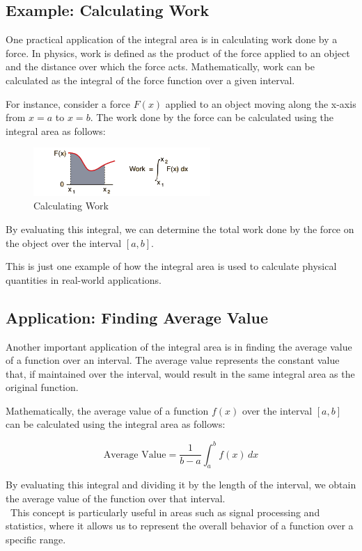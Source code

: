 \documentclass{article}
\begin{document}
\subsection{Example: Calculating Work}
One practical application of the integral area is in calculating work done by a force. In physics, work is defined as the product of the force applied to an object and the distance over which the force acts. Mathematically, work can be calculated as the integral of the force function over a given interval.

For instance, consider a force $F(x)$ applied to an object moving along the x-axis from $x = a$ to $x = b$. The work done by the force can be calculated using the integral area as follows:
\begin{figure}[ht]
    \centering
    \includegraphics[width=0.6\textwidth]{Work.png}
    \caption{Calculating Work}
    \label{fig:integral_area}
    \vspace{10pt}
\end{figure}

By evaluating this integral, we can determine the total work done by the force on the object over the interval $[a, b]$.

This is just one example of how the integral area is used to calculate physical quantities in real-world applications.

\subsection{Application: Finding Average Value}
Another important application of the integral area is in finding the average value of a function over an interval. The average value represents the constant value that, if maintained over the interval, would result in the same integral area as the original function.

Mathematically, the average value of a function $f(x)$ over the interval $[a, b]$ can be calculated using the integral area as follows:

\begin{equation}
    \text{Average Value} = \frac{1}{b-a} \int_{a}^{b} f(x) \, dx
\end{equation}

By evaluating this integral and dividing it by the length of the interval, we obtain the average value of the function over that interval. \\\
This concept is particularly useful in areas such as signal processing and statistics, where it allows us to represent the overall behavior of a function over a specific range.
\end{document}
